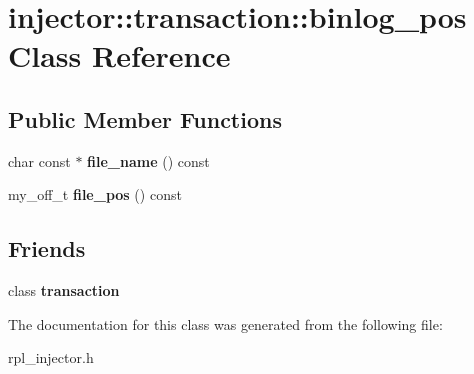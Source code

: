 \hypertarget{classinjector_1_1transaction_1_1binlog__pos}{}\section{injector\+:\+:transaction\+:\+:binlog\+\_\+pos Class Reference}
\label{classinjector_1_1transaction_1_1binlog__pos}
\subsection*{Public Member Functions}
\begin{DoxyCompactItemize}
\item 
\mbox{\label{classinjector_1_1transaction_1_1binlog__pos_ac95451d7d34024d55ea7fbf8bb542aee}} 
char const  $\ast$ {\bfseries file\+\_\+name} () const
\item 
\mbox{\label{classinjector_1_1transaction_1_1binlog__pos_ab91b421d2415b50feec7a62302ddeb25}} 
my\+\_\+off\+\_\+t {\bfseries file\+\_\+pos} () const
\end{DoxyCompactItemize}
\subsection*{Friends}
\begin{DoxyCompactItemize}
\item 
\mbox{\label{classinjector_1_1transaction_1_1binlog__pos_afcb110e61ed60a3170c870fc944fb3bf}} 
class {\bfseries transaction}
\end{DoxyCompactItemize}


The documentation for this class was generated from the following file\+:\begin{DoxyCompactItemize}
\item 
rpl\+\_\+injector.\+h\end{DoxyCompactItemize}
